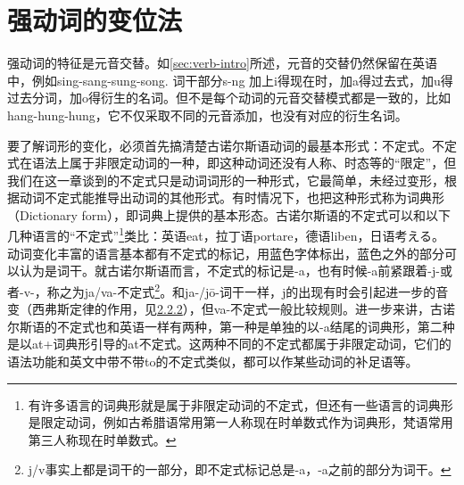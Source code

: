 \section{强动词的变位法}
强动词的特征是元音交替。如\ref{sec:verb-intro}所述，元音的交替仍然保留在英语中，例如sing-sang-sung-song. 词干部分s-ng 加上i得现在时，加a得过去式，加u得过去分词，加o得衍生的名词。但不是每个动词的元音交替模式都是一致的，比如hang-hung-hung，它不仅采取不同的元音添加，也没有对应的衍生名词。

要了解词形的变化，必须首先搞清楚古诺尔斯语动词的最基本形式：不定式。不定式在语法上属于非限定动词的一种，即这种动词还没有人称、时态等的“限定”，但我们在这一章谈到的不定式只是动词词形的一种形式，它最简单，未经过变形，根据动词不定式能推导出动词的其他形式。有时情况下，也把这种形式称为词典形（Dictionary form），即词典上提供的基本形态。古诺尔斯语的不定式可以和以下几种语言的``不定式''\footnote{有许多语言的词典形就是属于非限定动词的不定式，但还有一些语言的词典形是限定动词，例如古希腊语常用第一人称现在时单数式作为词典形，梵语常用第三人称现在时单数式。}类比：英语eat，拉丁语portare，德语liben，日语考える。动词变化丰富的语言基本都有不定式的标记，用蓝色字体标出，蓝色之外的部分可以认为是词干。就古诺尔斯语而言，不定式的标记是-a，也有时候-a前紧跟着-j-或者-v-，称之为ja/va-不定式\footnote{j/v事实上都是词干的一部分，即不定式标记总是-a，-a之前的部分为词干。}。和ja-/jō-词干一样，j的出现有时会引起进一步的音变（西弗斯定律的作用，见\hyperref[ajawa-ux8bcdux5e72]{2.2.2}），但va-不定式一般比较规则。进一步来讲，古诺尔斯语的不定式也和英语一样有两种，第一种是单独的以-a结尾的词典形，第二种是以at+词典形引导的at不定式。这两种不同的不定式都属于非限定动词，它们的语法功能和英文中带不带to的不定式类似，都可以作某些动词的补足语等。
